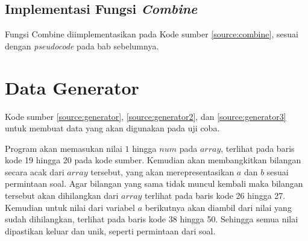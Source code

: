 	\subsection{\quad Implementasi Fungsi \textit{Combine}}
	\quad Fungsi Combine diimplementasikan pada Kode sumber \ref{source:combine}, sesuai dengan \textit{pseudocode} pada bab sebelumnya.
	
	
\section{\quad Data Generator}
\quad Kode sumber \ref{source:generator}, \ref{source:generator2}, dan \ref{source:generator3}  untuk membuat data yang akan digunakan pada uji coba.


\vspace{4.5cm}	

\quad Program akan memasukan nilai $1$ hingga $num$ pada \textit{$array$}, terlihat pada baris kode 19 hingga 20 pada kode sumber. Kemudian akan membangkitkan bilangan secara acak dari \textit{$array$} tersebut, yang akan merepresentasikan $a$ dan $b$ sesuai permintaan soal. Agar bilangan yang sama tidak muncul kembali maka bilangan tersebut akan dihilangkan dari \textit{$array$} terlihat pada baris kode 26 hingga 27. Kemudian untuk nilai dari variabel $a$ berikutnya akan diambil dari nilai yang sudah dihilangkan, terlihat pada baris kode 38 hingga 50. Sehingga semua nilai dipastikan keluar dan unik, seperti permintaan dari soal.
	
	